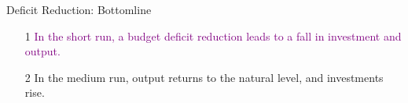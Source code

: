 \documentclass[shownotes,11pt, aspectratio=169]{beamer}
\begin{document}
\begin{frame}
\end{frame}

\begin{frame}{Deficit Reduction: Bottomline}
\begin{itemize}
\item[1] \textcolor{purple}{In the short run, a budget deficit reduction leads to a fall in investment and output.}
\pause
\vspace{6mm}
\item[2] \textcolor{ao(english)}{In the medium run, output returns to the natural level, and investments rise.}
\end{itemize}
\end{frame}
\end{document}
